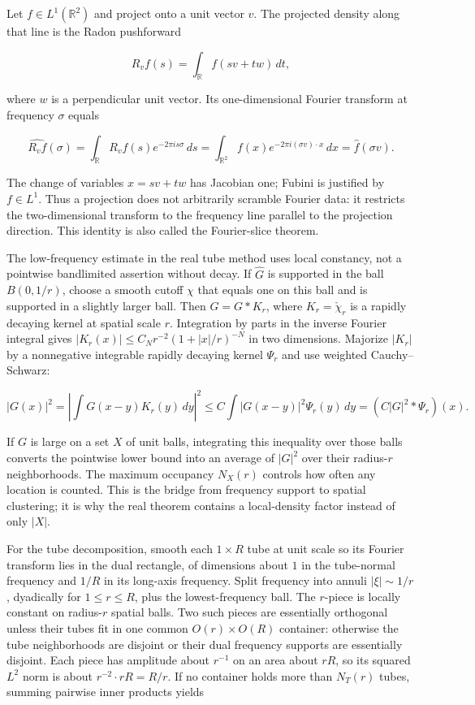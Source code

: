 Let \(f\in L^1(\mathbb R^2)\) and project onto a unit vector \(v\). The projected density along that line is the Radon pushforward

\[R_vf(s)=\int_{\mathbb R}f(sv+tw)\,dt,\]

where \(w\) is a perpendicular unit vector. Its one-dimensional Fourier transform at frequency \(\sigma\) equals

\[\widehat{R_vf}(\sigma)=\int_{\mathbb R}R_vf(s)e^{-2\pi i s\sigma}\,ds=\int_{\mathbb R^2}f(x)e^{-2\pi i (\sigma v)\cdot x}\,dx=\widehat f(\sigma v).\]

The change of variables \(x=sv+tw\) has Jacobian one; Fubini is justified by \(f\in L^1\). Thus a projection does not arbitrarily scramble Fourier data: it restricts the two-dimensional transform to the frequency line parallel to the projection direction. This identity is also called the Fourier-slice theorem.

The low-frequency estimate in the real tube method uses local constancy, not a pointwise bandlimited assertion without decay. If \(\widehat G\) is supported in the ball \(B(0,1/r)\), choose a smooth cutoff \(\chi\) that equals one on this ball and is supported in a slightly larger ball. Then \(G=G*K_r\), where \(K_r=\check\chi_r\) is a rapidly decaying kernel at spatial scale \(r\). Integration by parts in the inverse Fourier integral gives \(|K_r(x)|\le C_Nr^{-2}(1+|x|/r)^{-N}\) in two dimensions. Majorize \(|K_r|\) by a nonnegative integrable rapidly decaying kernel \(\Psi_r\) and use weighted Cauchy--Schwarz:

\[|G(x)|^2=\left|\int G(x-y)K_r(y)\,dy\right|^2\le C\int |G(x-y)|^2\Psi_r(y)\,dy=(C|G|^2*\Psi_r)(x).\]

If \(G\) is large on a set \(X\) of unit balls, integrating this inequality over those balls converts the pointwise lower bound into an average of \(|G|^2\) over their radius-\(r\) neighborhoods. The maximum occupancy \(N_X(r)\) controls how often any location is counted. This is the bridge from frequency support to spatial clustering; it is why the real theorem contains a local-density factor instead of only \(|X|\).

For the tube decomposition, smooth each \(1\times R\) tube at unit scale so its Fourier transform lies in the dual rectangle, of dimensions about \(1\) in the tube-normal frequency and \(1/R\) in its long-axis frequency. Split frequency into annuli \(|\xi|\sim1/r\), dyadically for \(1\le r\le R\), plus the lowest-frequency ball. The \(r\)-piece is locally constant on radius-\(r\) spatial balls. Two such pieces are essentially orthogonal unless their tubes fit in one common \(O(r)\times O(R)\) container: otherwise the tube neighborhoods are disjoint or their dual frequency supports are essentially disjoint. Each piece has amplitude about \(r^{-1}\) on an area about \(rR\), so its squared \(L^2\) norm is about \(r^{-2}\cdot rR=R/r\). If no container holds more than \(N_T(r)\) tubes, summing pairwise inner products yields

